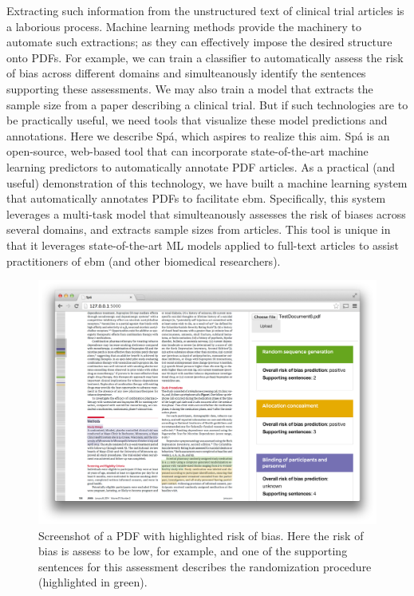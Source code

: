 \documentclass[runningheads,a4paper]{llncs}
\begin{document}
Extracting such information from the unstructured text of clinical trial articles is a laborious process.
Machine learning methods provide the machinery to automate such extractions; as they can effectively impose the desired structure onto PDFs.
For example, we can train a classifier to automatically assess the risk of bias across different domains and simulteanously identify the sentences supporting these assessments.
We may also train a model that extracts the sample size from a paper describing a clinical trial. 
But if such technologies are to be practically useful, we need tools that visualize these model predictions and annotations.
Here we describe Spá, which aspires to realize this aim.
Spá is an open-source, web-based tool that can incorporate state-of-the-art machine learning predictors to automatically annotate PDF articles.
As a practical (and useful) demonstration of this technology, we have built a machine learning system that automatically annotates PDFs to facilitate \ac{ebm}. 
Specifically, this system leverages a multi-task model that simulteanously assesses the risk of biases across several domains, and extracts sample sizes from articles.
This tool is unique in that it leverages state-of-the-art ML models applied to full-text articles to assist practitioners of \ac{ebm} (and other biomedical researchers). 
 
\begin{figure}[htb]
\centering
\includegraphics[width=.8\linewidth]{./images/screenshot2.png}
\vspace{-1em}
\caption{\label{fig:screenshot}Screenshot of a PDF with highlighted risk of bias. Here the risk of bias is assess to be low, for example, and one of the supporting sentences for this assessment describes the randomization procedure (highlighted in green).}
\vspace{-2em}
\end{figure}
\end{document}
